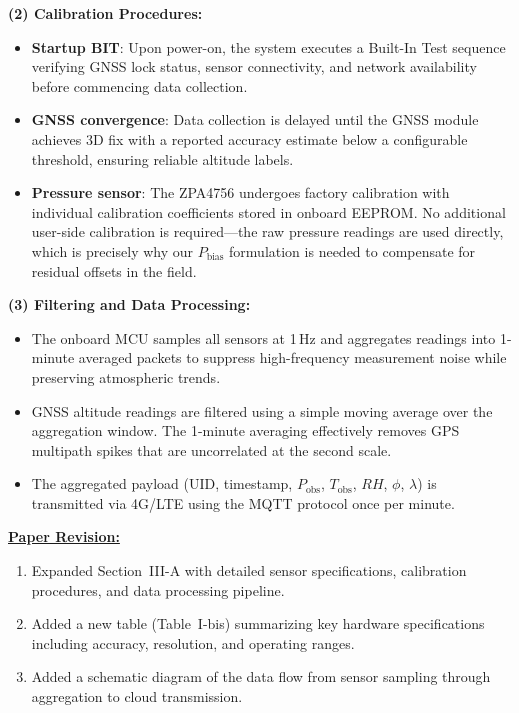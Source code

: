 \textbf{(2) Calibration Procedures:}
\begin{itemize}
    \item \textbf{Startup BIT}: Upon power-on, the system executes a Built-In Test sequence verifying GNSS lock status, sensor connectivity, and network availability before commencing data collection.
    \item \textbf{GNSS convergence}: Data collection is delayed until the GNSS module achieves 3D fix with a reported accuracy estimate below a configurable threshold, ensuring reliable altitude labels.
    \item \textbf{Pressure sensor}: The ZPA4756 undergoes factory calibration with individual calibration coefficients stored in onboard EEPROM. No additional user-side calibration is required---the raw pressure readings are used directly, which is precisely why our $P_{\text{bias}}$ formulation is needed to compensate for residual offsets in the field.
\end{itemize}

\textbf{(3) Filtering and Data Processing:}
\begin{itemize}
    \item The onboard MCU samples all sensors at 1\,Hz and aggregates readings into 1-minute averaged packets to suppress high-frequency measurement noise while preserving atmospheric trends.
    \item GNSS altitude readings are filtered using a simple moving average over the aggregation window. The 1-minute averaging effectively removes GPS multipath spikes that are uncorrelated at the second scale.
    \item The aggregated payload (UID, timestamp, $P_{\text{obs}}$, $T_{\text{obs}}$, $RH$, $\phi$, $\lambda$) is transmitted via 4G/LTE using the MQTT protocol once per minute.
\end{itemize}

\vspace{0.1cm}
\noindent
\underline{\textbf{Paper Revision:}}

\begin{enumerate}
    \item Expanded Section~III-A with detailed sensor specifications, calibration procedures, and data processing pipeline.
    \item Added a new table (Table~I-bis) summarizing key hardware specifications including accuracy, resolution, and operating ranges.
    \item Added a schematic diagram of the data flow from sensor sampling through aggregation to cloud transmission.
\end{enumerate}

